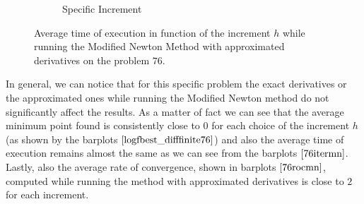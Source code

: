\begin{figure}[htbp]
\begin{subfigure}[t]{0.45\textwidth}
        \caption{Specific Increment }
    \end{subfigure}
    \caption{ \small Average time of execution in function of the increment $h$  while running the Modified Newton Method with approximated derivatives on the problem $76$.}
    \label{76itermn}
\end{figure}

In general, we can notice that for this specific problem the exact derivatives or the approximated ones while running the Modified Newton method do not significantly affect the results. As a matter of fact we can see that the average minimum point found is consistently close to $0$ for each choice of the increment $h$ (as shown by the barplots $\eqref{logfbest_difffinite76}$) and also the average time of execution remains almost the same as we can see from the barplots $\eqref{76itermn}$. 
Lastly, also the average rate of convergence, shown in barplots $\eqref{76rocmn}$,  computed while running the method with approximated derivatives is close to $2$ for each increment.


